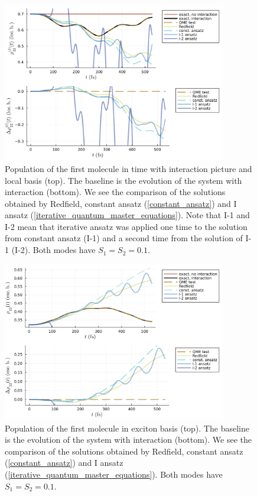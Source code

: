 \newpage
\begin{figure}[H]
\centering
\includegraphics[width=0.87\textwidth]{img/ansatz/iterative02_I_joined_intloc22.png}
\caption{Population of the first molecule in time with interaction picture and local basis (top). The baseline is the evolution of the system with interaction (bottom). We see the comparison of the solutions obtained by Redfield, constant ansatz (\ref{constant_ansatz}) and I ansatz (\ref{iterative_quantum_master_equations}). Note that I-1 and I-2 mean that iterative ansatz was applied one time to the solution from constant ansatz (I-1) and a second time from the solution of I-1 (I-2). Both modes have $S_1=S_2=0.1$.}
\label{img:iterative02_I_joined_intloc22}
\end{figure}

\begin{figure}[H]
\centering
\includegraphics[width=0.87\textwidth]{img/ansatz/iterative02_I_joined_schexc22.png}
\caption{Population of the first molecule in exciton basis (top). The baseline is the evolution of the system with interaction (bottom). We see the comparison of the solutions obtained by Redfield, constant ansatz (\ref{constant_ansatz}) and I ansatz (\ref{iterative_quantum_master_equations}). Both modes have $S_1=S_2=0.1$.}
\label{img:iterative02_I_joined_schexc22}
\end{figure}

